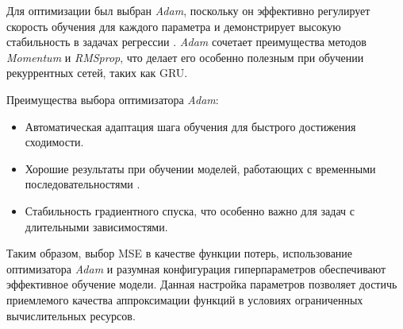 Для оптимизации был выбран \textit{Adam}, поскольку он эффективно регулирует скорость обучения для каждого параметра и демонстрирует высокую стабильность в задачах регрессии \cite{HOML}. \textit{Adam} сочетает преимущества методов \textit{Momentum} и \textit{RMSprop}, что делает его особенно полезным при обучении рекуррентных сетей, таких как GRU.

Преимущества выбора оптимизатора \textit{Adam}:
\begin{itemize}
    \item Автоматическая адаптация шага обучения для быстрого достижения сходимости.
    \item Хорошие результаты при обучении моделей, работающих с временными последовательностями \cite{adam}.
    \item Стабильность градиентного спуска, что особенно важно для задач с длительными зависимостями.
\end{itemize}

Таким образом, выбор MSE в качестве функции потерь, использование оптимизатора \textit{Adam} и разумная конфигурация гиперпараметров обеспечивают эффективное обучение модели. Данная настройка параметров позволяет достичь приемлемого качества аппроксимации функций в условиях ограниченных вычислительных ресурсов.
